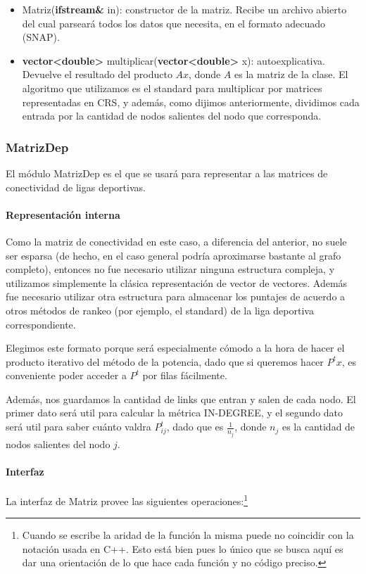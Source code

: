 \begin{itemize}
    \item Matriz(\textbf{ifstream\&} in): constructor de la matriz. Recibe un archivo abierto del cual parseará todos los datos que necesita, en el formato adecuado (SNAP).

    \item \textbf{vector<double>} multiplicar(\textbf{vector<double>} x): autoexplicativa. Devuelve el resultado del producto $Ax$, donde $A$ es la matriz de la clase. El algoritmo que utilizamos es el standard para multiplicar por matrices representadas en CRS, y además, como dijimos anteriormente, dividimos cada entrada por la cantidad de nodos salientes del nodo que corresponda.
\end{itemize}

\subsubsection{MatrizDep}
El módulo MatrizDep es el que se usará para representar a las matrices de conectividad de ligas deportivas.
\paragraph{Representación interna}

Como la matriz de conectividad en este caso, a diferencia del anterior, no suele ser esparsa (de hecho, en el caso general podría aproximarse bastante al grafo completo), entonces no fue necesario utilizar ninguna estructura compleja, y utilizamos simplemente la clásica representación de vector de vectores. Además fue necesario utilizar otra estructura para almacenar los puntajes de acuerdo a otros métodos de rankeo (por ejemplo, el standard) de la liga deportiva correspondiente.

Elegimos este formato porque será especialmente cómodo a la hora de hacer el producto iterativo del método de la potencia, dado que si queremos hacer $P^tx$, es conveniente poder acceder a $P^t$ por filas fácilmente. 

Además, nos guardamos la cantidad de links que entran y salen de cada nodo. El primer dato será util para calcular la métrica IN-DEGREE, y el segundo dato será util para saber cuánto valdra $P^t_{ij}$, dado que es $\frac{1}{n_j}$, donde $n_j$ es la cantidad de nodos salientes del nodo $j$.

\paragraph{Interfaz}
La interfaz de Matriz provee las siguientes operaciones:\footnote{Cuando se escribe la aridad de la función la misma puede no coincidir con la notación usada en C++. Esto está bien pues lo único que se busca aquí es dar una orientación de lo que hace cada función y no código preciso.}

